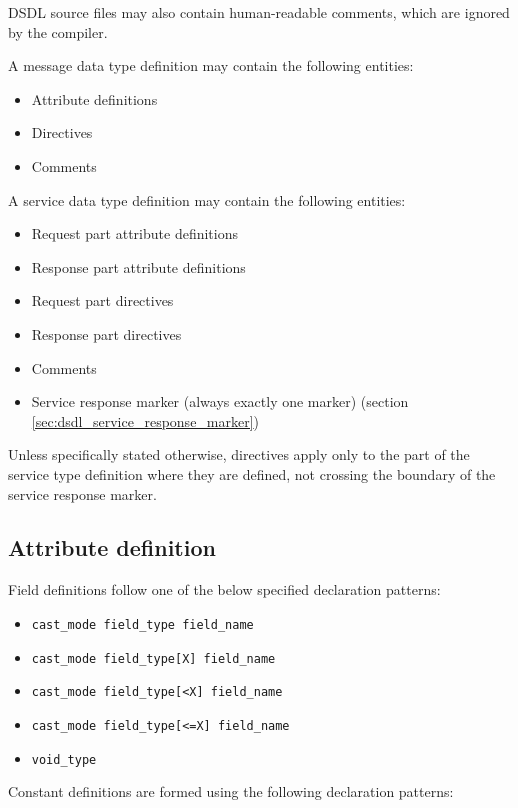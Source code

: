 DSDL source files may also contain human-readable comments, which are ignored by the compiler.

A message data type definition may contain the following entities:

\begin{itemize}
    \item Attribute definitions
    \item Directives
    \item Comments
\end{itemize}

A service data type definition may contain the following entities:

\begin{itemize}
    \item Request part attribute definitions
    \item Response part attribute definitions
    \item Request part directives
    \item Response part directives
    \item Comments
    \item Service response marker (always exactly one marker) (section \ref{sec:dsdl_service_response_marker})
\end{itemize}

Unless specifically stated otherwise,
directives apply only to the part of the service type definition where they are defined,
not crossing the boundary of the service response marker.

\subsection{Attribute definition}

Field definitions follow one of the below specified declaration patterns:

\begin{itemize}
    \item \verb|cast_mode field_type field_name|
    \item \verb|cast_mode field_type[X] field_name|
    \item \verb|cast_mode field_type[<X] field_name|
    \item \verb|cast_mode field_type[<=X] field_name|
    \item \verb|void_type|
\end{itemize}

Constant definitions are formed using the following declaration patterns:

